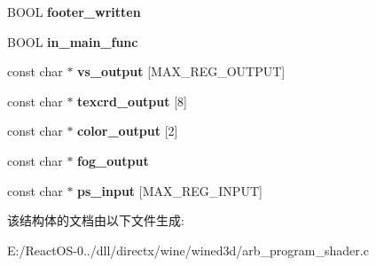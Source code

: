 \begin{DoxyCompactItemize}
B\+O\+OL {\bfseries footer\+\_\+written}
\item 
\mbox{\label{structshader__arb__ctx__priv_a73b3550f6cc62f0ab2d00a8a3213594e}} 
B\+O\+OL {\bfseries in\+\_\+main\+\_\+func}
\item 
\mbox{\label{structshader__arb__ctx__priv_a2274aa6eb9af87469eabeecd9c4db68d}} 
const char $\ast$ {\bfseries vs\+\_\+output} \mbox{[}M\+A\+X\+\_\+\+R\+E\+G\+\_\+\+O\+U\+T\+P\+UT\mbox{]}
\item 
\mbox{\label{structshader__arb__ctx__priv_afae97bc6a8b0fbcb1c4157c0cc2dcc6c}} 
const char $\ast$ {\bfseries texcrd\+\_\+output} \mbox{[}8\mbox{]}
\item 
\mbox{\label{structshader__arb__ctx__priv_a249f014ce0714a804027195e3e089c82}} 
const char $\ast$ {\bfseries color\+\_\+output} \mbox{[}2\mbox{]}
\item 
\mbox{\label{structshader__arb__ctx__priv_ab8b5be845da1277ecec1ff6aa68d6c3e}} 
const char $\ast$ {\bfseries fog\+\_\+output}
\item 
\mbox{\label{structshader__arb__ctx__priv_a00300b94f047dd00565c6f93f2d20a39}} 
const char $\ast$ {\bfseries ps\+\_\+input} \mbox{[}M\+A\+X\+\_\+\+R\+E\+G\+\_\+\+I\+N\+P\+UT\mbox{]}
\end{DoxyCompactItemize}


该结构体的文档由以下文件生成\+:\begin{DoxyCompactItemize}
\item 
E\+:/\+React\+O\+S-\/0../dll/directx/wine/wined3d/arb\+\_\+program\+\_\+shader.\+c\end{DoxyCompactItemize}
